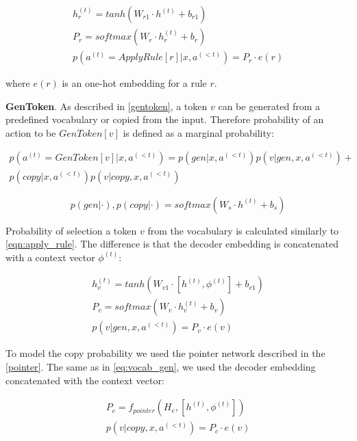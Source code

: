 \begin{equation}
\begin{gathered}
    h^{(t)}_r = tanh(W _{r1}\cdot h^{(t)} + b_{r1}) \\
    P_r = softmax(W_r\cdot h^{(t)}_r  + b_r) \\
    p(a^{(t)} = ApplyRule[r]|x,a^{(<t)}) = P_r\cdot e(r)
\end{gathered}
\label{eqn:apply_rule}
\end{equation}

where $e(r)$ is an one-hot embedding for a rule $r$.

\textbf{GenToken}. As described in \cref{gentoken}, a token $v$ can be generated from a predefined vocabulary or copied from the input. Therefore probability of an action to be $GenToken[v]$ is defined as a marginal probability:
    
\begin{equation}
\begin{gathered}
    p(a^{(t)} = GenToken[v]|x,a^{(<t)}) = p(gen|x, a^{(<t)}) p(v|gen, x, a^{(<t)}) + \\
    p(copy|x, a^{(<t)}) p(v|copy, x, a^{(<t)})
\end{gathered}
\end{equation}

\begin{equation}
    p(gen|\cdot), p(copy|\cdot) = softmax(W_s\cdot h^{(t)} + b_s)
\end{equation}

Probability of selection a token $v$ from the vocabulary is calculated similarly to \cref{eqn:apply_rule}. The difference is that the decoder embedding is concatenated with a context vector $\phi^{(t)}$:

\begin{equation}
\begin{gathered}
    h^{(t)}_v = tanh(W _{v1}\cdot [h^{(t)}, \phi^{(t)}] + b_{v1}) \\
    P_v = softmax(W_v\cdot h^{(t)}_v  + b_v) \\
    p(v|gen, x, a^{(<t)}) = P_v\cdot e(v)
\end{gathered}
\label{eq:vocab_gen}
\end{equation}

To model the copy probability we used the pointer network \parencite{Vinyals2015} described in the \cref{pointer}. The same as in \cref{eq:vocab_gen}, we used the decoder embedding concatenated with the context vector:

\begin{equation}
\begin{gathered}
    P_c = f_{pointer}(H_e, [h^{(t)}, \phi^{(t)}]) \\
    p(v|copy, x, a^{(<t)}) = P_c \cdot e(v)
\end{gathered}
\end{equation}

